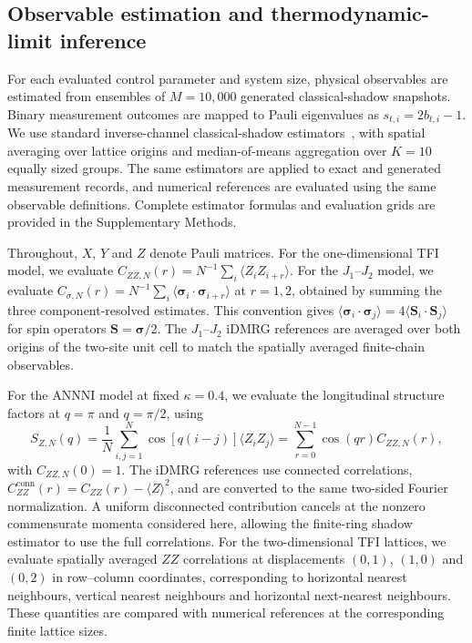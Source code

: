 \documentclass[pdflatex,sn-nature]{sn-jnl}%
\theoremstyle{thmstyleone}%
\theoremstyle{thmstyletwo}%
\theoremstyle{thmstylethree}%
\begin{document}

\subsection{Observable estimation and thermodynamic-limit inference}
\label{sec:method_observables}

For each evaluated control parameter and system size, physical observables are estimated from ensembles of \(M=10{,}000\) generated classical-shadow snapshots. Binary measurement outcomes are mapped to Pauli eigenvalues as \(s_{t,i}=2b_{t,i}-1\). We use standard inverse-channel classical-shadow estimators~\cite{huang2020predicting}, with spatial averaging over lattice origins and median-of-means aggregation over \(K=10\) equally sized groups. The same estimators are applied to exact and generated measurement records, and numerical references are evaluated using the same observable definitions. Complete estimator formulas and evaluation grids are provided in the Supplementary Methods.

Throughout, \(X\), \(Y\) and \(Z\) denote Pauli matrices. For the one-dimensional TFI model, we evaluate
\(C_{ZZ,N}(r)=N^{-1}\sum_i\langle Z_iZ_{i+r}\rangle\).
For the \(J_1\)--\(J_2\) model, we evaluate
\(C_{\sigma,N}(r)=N^{-1}\sum_i
\langle\boldsymbol{\sigma}_i\cdot\boldsymbol{\sigma}_{i+r}\rangle\)
at \(r=1,2\), obtained by summing the three component-resolved estimates. This convention gives
\(\langle\boldsymbol{\sigma}_i\cdot\boldsymbol{\sigma}_j\rangle
=4\langle\mathbf{S}_i\cdot\mathbf{S}_j\rangle\)
for spin operators \(\mathbf{S}=\boldsymbol{\sigma}/2\).
The \(J_1\)--\(J_2\) iDMRG references are averaged over both origins of the two-site unit cell to match the spatially averaged finite-chain observables.

For the ANNNI model at fixed \(\kappa=0.4\), we evaluate the longitudinal structure factors at \(q=\pi\) and \(q=\pi/2\), using
\begin{equation}
\label{eq:annni_structure_factor_definition}
S_{Z,N}(q)
=
\frac{1}{N}
\sum_{i,j=1}^{N}
\cos[q(i-j)]\langle Z_iZ_j\rangle
=
\sum_{r=0}^{N-1}
\cos(qr)C_{ZZ,N}(r),
\end{equation}
with \(C_{ZZ,N}(0)=1\).
The iDMRG references use connected correlations,
\(C_{ZZ}^{\mathrm{conn}}(r)
=C_{ZZ}(r)-\langle Z\rangle^2\),
and are converted to the same two-sided Fourier normalization.
A uniform disconnected contribution cancels at the nonzero commensurate momenta considered here, allowing the finite-ring shadow estimator to use the full correlations.
For the two-dimensional TFI lattices, we evaluate spatially averaged \(ZZ\) correlations at displacements
\((0,1)\), \((1,0)\) and \((0,2)\) in row--column coordinates, corresponding to horizontal nearest neighbours, vertical nearest neighbours and horizontal next-nearest neighbours. These quantities are compared with numerical references at the corresponding finite lattice sizes.
\end{document}
